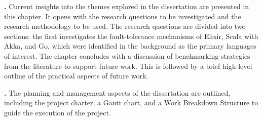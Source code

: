 \textbf{.} Current insights into the themes explored in the dissertation are presented in this chapter. It opens with the research questions to be investigated and the research methodology to be used. The research questions are divided into two sections: the first investigates the fault-tolerance mechanisms of Elixir, Scala with Akka, and Go, which were identified in the background as the primary languages of interest. The chapter concludes with a discussion of benchmarking strategies from the literature to support future work. This is followed by a brief high-level outline of the practical aspects of future work. 

\textbf{.} The planning and management aspects of the dissertation are outlined, including the project charter, a Gantt chart, and a Work Breakdown Structure to guide the execution of the project.